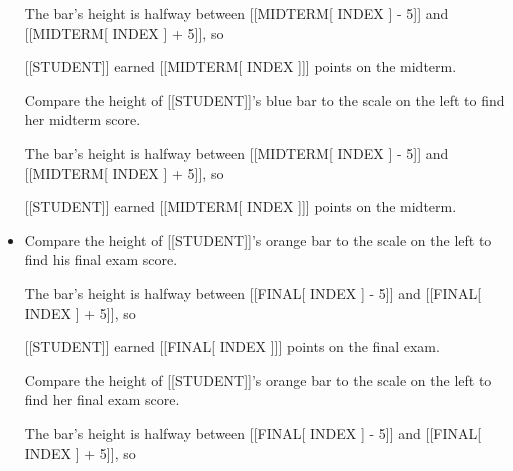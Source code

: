 \documentclass{article}
\begin{document}
\begin{itemize}
                                The bar's height is halfway between [[MIDTERM[ INDEX ] - 5]] and [[MIDTERM[ INDEX ] + 5]], so
                            
                            [[STUDENT]] earned [[MIDTERM[ INDEX ]]] points on the midterm.
                        
                            Compare the height of [[STUDENT]]'s blue bar to the scale on the left to find her midterm score.
                            
                                The bar's height is halfway between [[MIDTERM[ INDEX ] - 5]] and [[MIDTERM[ INDEX ] + 5]], so
                            
                            [[STUDENT]] earned [[MIDTERM[ INDEX ]]] points on the midterm.
  \item Compare the height of [[STUDENT]]'s orange bar to the scale on the left to find his final exam score.
                            
                                The bar's height is halfway between [[FINAL[ INDEX ] - 5]] and [[FINAL[ INDEX ] + 5]], so
                            
                            [[STUDENT]] earned [[FINAL[ INDEX ]]] points on the final exam.
                        
                            Compare the height of [[STUDENT]]'s orange bar to the scale on the left to find her final exam score.
                            
                                The bar's height is halfway between [[FINAL[ INDEX ] - 5]] and [[FINAL[ INDEX ] + 5]], so
                            

\end{itemize}
\end{document}

